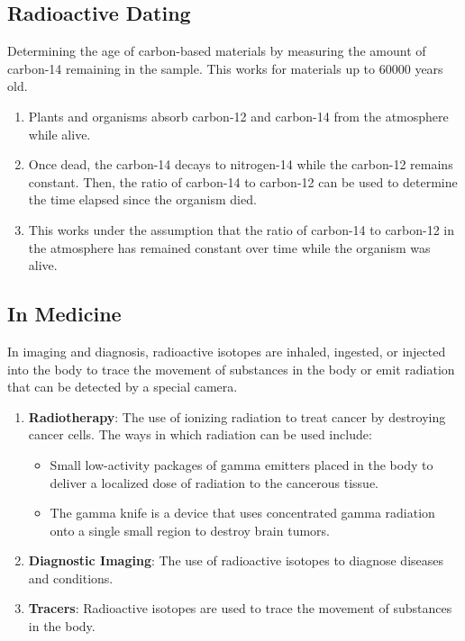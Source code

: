 \documentclass[a4paper,12pt]{article}
\begin{document}
\subsection{Radioactive Dating}

Determining the age of carbon-based materials by measuring the amount of carbon-14 remaining in the sample. This works for materials up to 60000 years old.
\begin{enumerate}
  \item Plants and organisms absorb carbon-12 and carbon-14 from the atmosphere while alive.
  \item Once dead, the carbon-14 decays to nitrogen-14 while the carbon-12 remains constant. Then, the ratio of carbon-14 to carbon-12 can be used to determine the time elapsed since the organism died.
  \item This works under the assumption that the ratio of carbon-14 to carbon-12 in the atmosphere has remained constant over time while the organism was alive.
\end{enumerate}

\subsection{In Medicine}

In imaging and diagnosis, radioactive isotopes are inhaled, ingested, or injected into the body to trace the movement of substances in the body or emit radiation that can be detected by a special camera.

\begin{enumerate}
  \item \textbf{Radiotherapy}: The use of ionizing radiation to treat cancer by destroying cancer cells. The ways in which radiation can be used include:
        \begin{itemize}
          \item Small low-activity packages of gamma emitters placed in the body to deliver a localized dose of radiation to the cancerous tissue.
          \item The gamma knife is a device that uses concentrated gamma radiation onto a single small region to destroy brain tumors.
        \end{itemize}
  \item \textbf{Diagnostic Imaging}: The use of radioactive isotopes to diagnose diseases and conditions.
  \item \textbf{Tracers}: Radioactive isotopes are used to trace the movement of substances in the body.
\end{enumerate}
\end{document}
